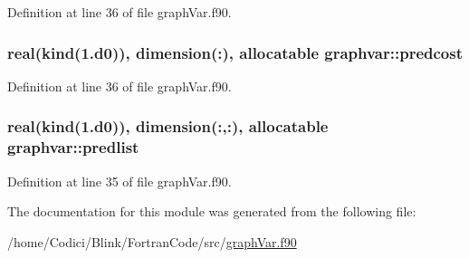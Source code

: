 Definition at line 36 of file graph\-Var.\-f90.

\hypertarget{classgraphvar_ade6890fe2822d19eea989655d35af2b9}{
\subsubsection[{predcost}]{\setlength{\rightskip}{0pt plus 5cm}real(kind(1.d0)), dimension(\-:), allocatable graphvar\-::predcost}}\label{classgraphvar_ade6890fe2822d19eea989655d35af2b9}


Definition at line 36 of file graph\-Var.\-f90.

\hypertarget{classgraphvar_a8753856c2f5a52fc08eb6921a26bc1d8}{
\subsubsection[{predlist}]{\setlength{\rightskip}{0pt plus 5cm}real(kind(1.d0)), dimension(\-:,\-:), allocatable graphvar\-::predlist}}\label{classgraphvar_a8753856c2f5a52fc08eb6921a26bc1d8}


Definition at line 35 of file graph\-Var.\-f90.



The documentation for this module was generated from the following file\-:\begin{DoxyCompactItemize}
\item 
/home/\-Codici/\-Blink/\-Fortran\-Code/src/\hyperlink{graph_var_8f90}{graph\-Var.\-f90}\end{DoxyCompactItemize}
